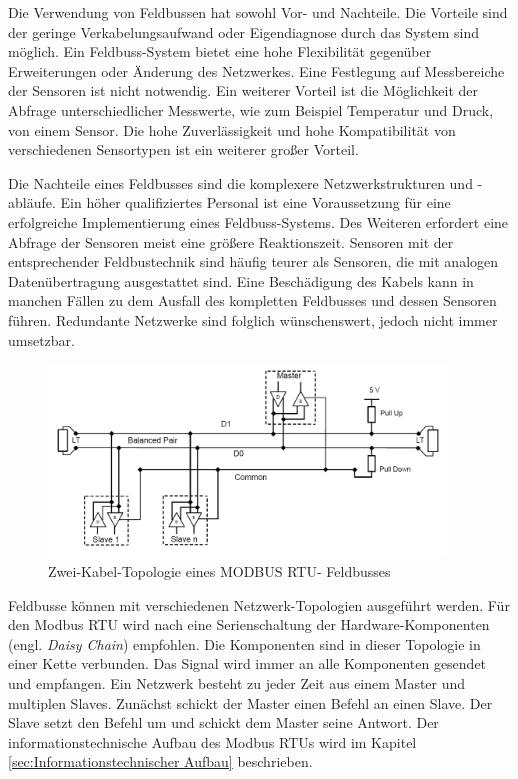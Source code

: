 Die Verwendung von Feldbussen hat sowohl Vor- und Nachteile. Die Vorteile sind der geringe Verkabelungsaufwand oder Eigendiagnose durch das System sind möglich. Ein Feldbuss-System bietet eine hohe Flexibilität gegenüber Erweiterungen oder Änderung des Netzwerkes. Eine Festlegung auf Messbereiche der Sensoren ist nicht notwendig. Ein weiterer Vorteil ist die Möglichkeit der Abfrage unterschiedlicher Messwerte, wie zum Beispiel Temperatur und Druck, von einem Sensor. Die hohe Zuverlässigkeit und hohe Kompatibilität von verschiedenen Sensortypen ist ein weiterer großer Vorteil.

Die Nachteile eines Feldbusses sind die komplexere Netzwerkstrukturen und -abläufe. Ein höher qualifiziertes Personal ist eine Voraussetzung für eine erfolgreiche Implementierung eines Feldbuss-Systems. Des Weiteren erfordert eine Abfrage der Sensoren meist eine größere Reaktionszeit. Sensoren mit der entsprechender Feldbustechnik sind häufig teurer als Sensoren, die mit analogen Datenübertragung ausgestattet sind. Eine Beschädigung des Kabels kann in manchen Fällen zu dem Ausfall des kompletten Feldbusses und dessen Sensoren führen. Redundante Netzwerke sind folglich wünschenswert, jedoch nicht immer umsetzbar. 

\begin{figure}[htb]
 \centering		\includegraphics[width=0.94\textwidth]{Pictures/TopologieModbus.png}
 \caption{Zwei-Kabel-Topologie eines MODBUS RTU- Feldbusses \citep{MODBUS.ORG2002}  }
 \label{fig:ZweiKabelModbus}
 \end{figure} 

Feldbusse können mit verschiedenen Netzwerk-Topologien ausgeführt werden. Für den Modbus RTU wird nach \citep{MODBUS.ORG2002} eine Serienschaltung der Hardware-Komponenten (engl. \textit{Daisy Chain}) empfohlen. Die Komponenten sind in dieser Topologie in einer Kette verbunden. Das Signal wird immer an alle Komponenten gesendet und empfangen. Ein Netzwerk besteht zu jeder Zeit aus einem Master und multiplen Slaves. Zunächst schickt der Master einen Befehl an einen Slave. Der Slave setzt den Befehl um und schickt dem Master seine Antwort. Der informationstechnische Aufbau des Modbus RTUs wird im Kapitel \ref{sec:Informationstechnischer Aufbau} beschrieben. 



